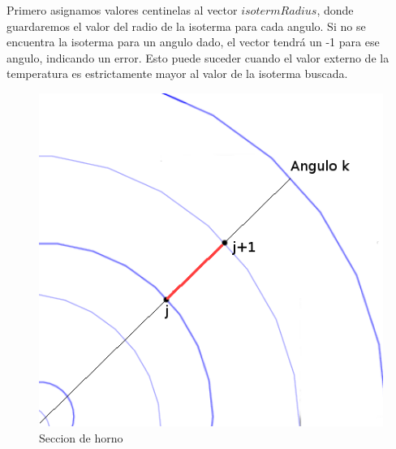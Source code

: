 Primero asignamos valores centinelas al vector $isotermRadius$, donde guardaremos el valor del radio de la isoterma para cada angulo. Si no se encuentra la isoterma para un angulo dado, el vector tendrá un -1 para ese angulo, indicando un error. Esto puede suceder cuando el valor externo de la temperatura es estrictamente mayor al valor de la isoterma buscada. \\
\begin{figure}
  \vspace{-20pt}
  \begin{center}
    \includegraphics[scale= 0.6]{imagenes/radiosLimpio.png}
  \end{center}
  \vspace{-20pt}
  \caption{Seccion de horno}
  \vspace{-10pt}
  \label{fig:Exp3}
\end{figure}

